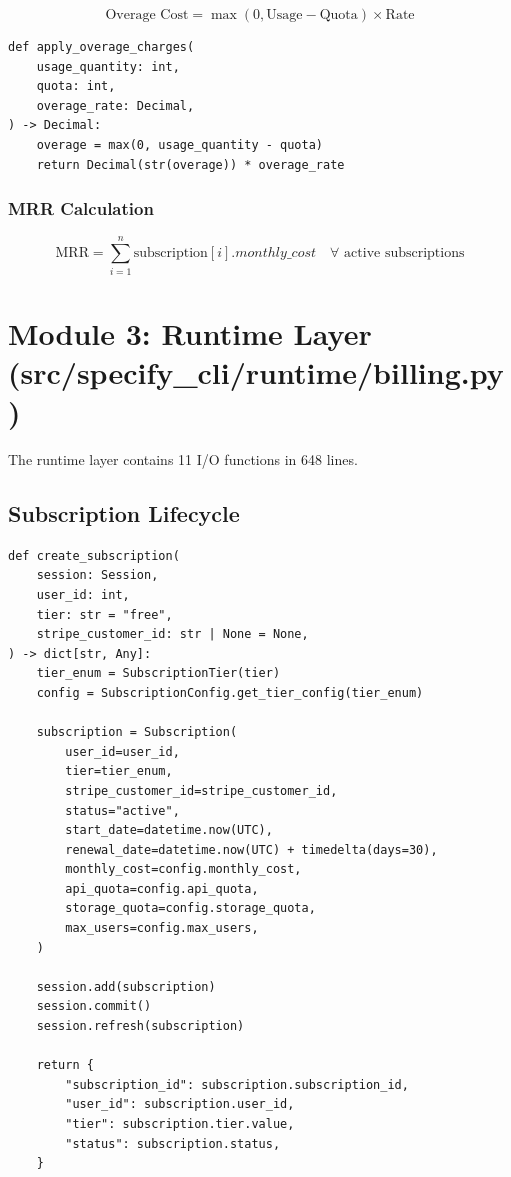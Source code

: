 \documentclass[12pt]{report}
\begin{document}
\begin{equation}
\text{Overage Cost} = \max(0, \text{Usage} - \text{Quota}) \times \text{Rate}
\end{equation}

\begin{lstlisting}
def apply_overage_charges(
    usage_quantity: int,
    quota: int,
    overage_rate: Decimal,
) -> Decimal:
    overage = max(0, usage_quantity - quota)
    return Decimal(str(overage)) * overage_rate
\end{lstlisting}

\subsubsection{MRR Calculation}

\begin{equation}
\text{MRR} = \sum_{i=1}^{n} \text{subscription}[i].monthly\_cost \quad \forall \text{ active subscriptions}
\end{equation}

\section{Module 3: Runtime Layer (src/specify\_cli/runtime/billing.py)}

The runtime layer contains 11 I/O functions in 648 lines.

\subsection{Subscription Lifecycle}

\begin{lstlisting}
def create_subscription(
    session: Session,
    user_id: int,
    tier: str = "free",
    stripe_customer_id: str | None = None,
) -> dict[str, Any]:
    tier_enum = SubscriptionTier(tier)
    config = SubscriptionConfig.get_tier_config(tier_enum)

    subscription = Subscription(
        user_id=user_id,
        tier=tier_enum,
        stripe_customer_id=stripe_customer_id,
        status="active",
        start_date=datetime.now(UTC),
        renewal_date=datetime.now(UTC) + timedelta(days=30),
        monthly_cost=config.monthly_cost,
        api_quota=config.api_quota,
        storage_quota=config.storage_quota,
        max_users=config.max_users,
    )

    session.add(subscription)
    session.commit()
    session.refresh(subscription)

    return {
        "subscription_id": subscription.subscription_id,
        "user_id": subscription.user_id,
        "tier": subscription.tier.value,
        "status": subscription.status,
    }
\end{lstlisting}
\end{document}
